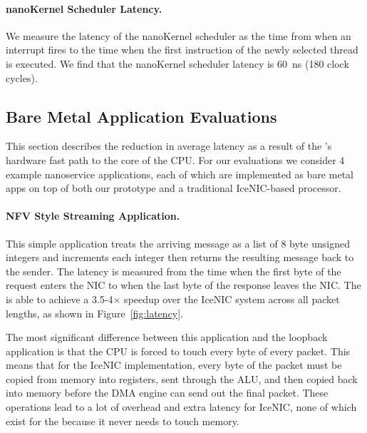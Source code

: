 \paragraph{nanoKernel Scheduler Latency.} We measure the latency of the nanoKernel scheduler as the time from when an interrupt fires to the time when the first instruction of the newly selected thread is executed.
We find that the nanoKernel scheduler latency is \SI{60}{ns} (180 clock cycles).

\subsection{Bare Metal Application Evaluations}
\label{ssec:bare-metal-evals}
This section describes the reduction in average latency as a result of the \name{}'s hardware fast path to the core of the CPU.
For our evaluations we consider 4 example nanoservice applications, each of which are implemented as bare metal apps on top of both our \name{} prototype and a traditional IceNIC-based processor.

\paragraph{NFV Style Streaming Application.} This simple application treats the arriving message as a list of 8 byte unsigned integers and increments each integer then returns the resulting message back to the sender.
The latency is measured from the time when the first byte of the request enters the NIC to when the last byte of the response leaves the NIC.
The \name{} is able to achieve a 3.5-4$\times$ speedup over the IceNIC system across all packet lengths, as shown in Figure~\ref{fig:latency}.

The most significant difference between this application and the loopback application is that the CPU is forced to touch every byte of every packet.
This means that for the IceNIC implementation, every byte of the packet must be copied from memory into registers, sent through the ALU, and then copied back into memory before the DMA engine can send out the final packet.
These operations lead to a lot of overhead and extra latency for IceNIC, none of which exist for the \name{} because it never needs to touch memory.

